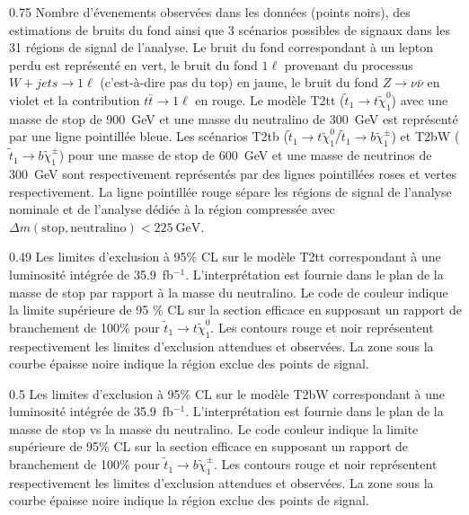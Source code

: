                  {0.75}       %
                 {Nombre d'évenements observées dans les données (points noirs), des estimations de bruits du fond ainsi que 3 scénarios possibles de signaux dans les 31 régions de signal de l'analyse. Le bruit du fond correspondant à un lepton perdu est représenté en vert, le bruit du fond  $ 1 \ell $ provenant du processus $ W + jets \to 1 \ell $ (c'est-à-dire pas du top) en jaune, le bruit du fond $ Z \to \nu \bar {\nu} $  en violet et la contribution $ t \bar {t} \to 1 \ell $ en rouge. Le modèle T2tt ($ \tilde{t}_{1} \to t \tilde {\chi}^{0}_{1} $) avec une masse de stop de 900~GeV et une masse du neutralino de 300~GeV est représenté par une ligne pointillée bleue. Les scénarios T2tb ($\tilde{t}_{1} \to t \tilde{\chi}^{0}_{1} /\tilde{t}_{1} \to b \tilde{\chi}^{\pm}_{1}$) et T2bW ($\tilde{t}_{1} \to b \tilde{\chi}^{\pm}_{1} $) pour une masse de stop de 600~GeV et une masse de neutrinos de 300~GeV sont respectivement représentés par des lignes pointillées roses et vertes respectivement. La ligne pointillée rouge sépare les régions de signal de l'analyse  nominale et de l'analyse dédiée à la région compressée avec $\Delta m\mathrm{(stop, neutralino)<225~GeV}$. }

                 {0.49}       %
                 {Les limites d'exclusion à 95\% CL sur le modèle T2tt correspondant à une luminosité intégrée de 35.9~fb$^{-1}$. L'interprétation est fournie  dans le plan de la masse de stop par rapport à la masse du neutralino. Le code de couleur indique la limite supérieure de 95 \% CL sur la section efficace en supposant un rapport de branchement de 100\% pour $ \tilde {t}_{1} \to t \tilde{\chi}^{0}_{1} $. Les contours rouge et noir représentent respectivement les limites d'exclusion attendues et observées. La zone sous la courbe épaisse noire indique la région exclue des points de signal. }


                 {0.5}       %
                 { Les limites d'exclusion à 95\% CL sur le modèle T2bW correspondant à une luminosité intégrée de 35.9~fb$^{-1}$. L'interprétation est fournie dans le plan de la masse de stop vs la masse du neutralino. Le code couleur indique la limite supérieure de 95\% CL sur la section efficace en supposant un rapport de branchement de 100\% pour $ \tilde{t}_{1} \to b  \tilde{\chi}^{\pm}_{1} $.  Les contours rouge et noir représentent respectivement les limites d'exclusion attendues et observées. La zone sous la courbe épaisse noire indique la région exclue des points de signal. }


